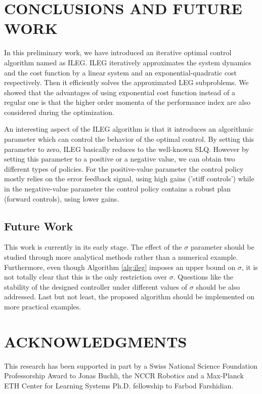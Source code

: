 \documentclass[letterpaper, 10 pt, conference]{ieeeconf}
\begin{document}
\section{CONCLUSIONS AND FUTURE WORK}
In this preliminary work, we have introduced an iterative optimal control
algorithm named as ILEG. ILEG iteratively approximates the system dynamics and
the cost function by a linear system and an exponential-quadratic cost
respectively. Then it efficiently solves the approximated LEG subproblems. We
showed that the advantages of using exponential cost function instead of a
regular one is that the higher order momenta of the performance index are also
considered during the optimization.
  
An interesting aspect of the ILEG algorithm is that it introduces an algorithmic
parameter which can control the behavior of the optimal control. By setting this
parameter to zero, ILEG basically reduces to the well-known SLQ. However by
setting this parameter to a positive or a negative value, we can obtain two
different types of policies. For the positive-value parameter the control policy
mostly relies on the error feedback signal, using high gains ('stiff controls')
while in the negative-value parameter the control policy contains a robust plan
(forward controls), using lower gains.

\subsection{Future Work}
This work is currently in its early stage. The effect of the $\sigma$ parameter
should be studied through more analytical methods rather than a numerical
example. Furthermore, even though Algorithm \ref{alg:ileg} imposes an upper bound
on $\sigma$, it is not totally clear that this is the only restriction over
$\sigma$. Questions like the stability of the designed controller under different
values of $\sigma$ should be also addressed. Last but not least, the proposed
algorithm should be implemented on more practical examples.

\section{ACKNOWLEDGMENTS}
This research has been supported in part by a Swiss National Science
Foundation Professorship Award to Jonas Buchli, the NCCR Robotics and a
Max-Planck ETH Center for Learning Systems Ph.D. fellowship to Farbod Farshidian.
\end{document}
